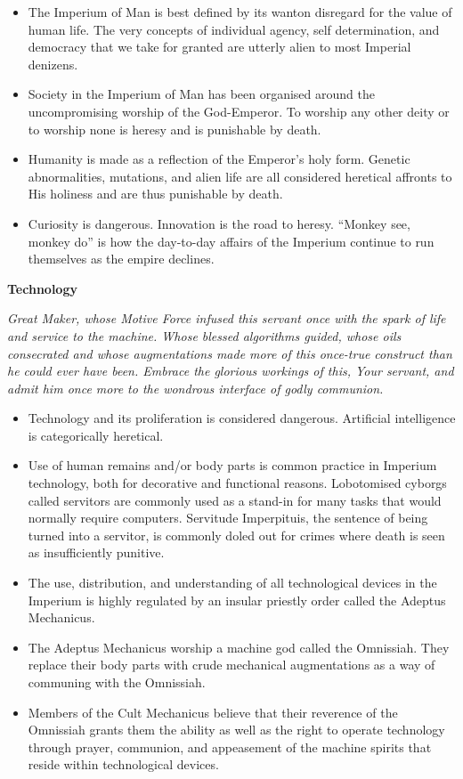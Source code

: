 \documentclass[10pt,a4paper]{article}
\newcommand{\rpgsection}[1]{%
  \vspace{0.8em}%
  {\headerfont\bfseries\Large #1}\par%
  \vspace{0.5em}%
}
\begin{document}
\begin{multicols}{2}
\begin{itemize}
  \item The Imperium of Man is best defined by its wanton disregard for the value of human life. The very concepts of individual agency, self determination, and democracy that we take for granted are utterly alien to most Imperial denizens.
  \item Society in the Imperium of Man has been organised around the uncompromising worship of the God-Emperor. To worship any other deity or to worship none is heresy and is punishable by death.
  \item Humanity is made as a reflection of the Emperor’s holy form. Genetic abnormalities, mutations, and alien life are all considered heretical affronts to His holiness and are thus punishable by death.
  \item Curiosity is dangerous. Innovation is the road to heresy. “Monkey see, monkey do” is how the day-to-day affairs of the Imperium continue to run themselves as the empire declines.
\end{itemize}

\rpgsection{Technology}
\textit{Great Maker, whose Motive Force infused this servant once with the spark of life and service to the machine. Whose blessed algorithms guided, whose oils consecrated and whose augmentations made more of this once-true construct than he could ever have been. Embrace the glorious workings of this, Your servant, and admit him once more to the wondrous interface of godly communion.}

\begin{itemize}
  \item Technology and its proliferation is considered dangerous. Artificial intelligence is categorically heretical.
  \item Use of human remains and/or body parts is common practice in Imperium technology, both for decorative and functional reasons. Lobotomised cyborgs called servitors are commonly used as a stand-in for many tasks that would normally require computers. Servitude Imperpituis, the sentence of being turned into a servitor, is commonly doled out for crimes where death is seen as insufficiently punitive.
  \item The use, distribution, and understanding of all technological devices in the Imperium is highly regulated by an insular priestly order called the Adeptus Mechanicus.
  \item The Adeptus Mechanicus worship a machine god called the Omnissiah. They replace their body parts with crude mechanical augmentations as a way of communing with the Omnissiah.
  \item Members of the Cult Mechanicus believe that their reverence of the Omnissiah grants them the ability as well as the right to operate technology through prayer, communion, and appeasement of the machine spirits that reside within technological devices.
\end{itemize}


\end{multicols}
\end{document}
